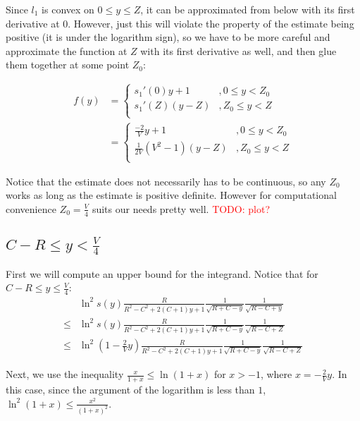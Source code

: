 \documentclass[12pt, a4paper]{article}
\newcommand{\todo}[1]{{\large \textcolor{red}{TODO: #1}}}
\begin{document}
Since $l_1$ is convex on $0 \le y \le Z$, it can be approximated from below with its first derivative at $0$. However, just this will violate the property of the estimate being positive (it is under the logarithm sign), so we have to be more careful and approximate the function at $Z$ with its first derivative as well, and then glue them together at some point $Z_0$:

\begin{align*}
f(y)
& = 
\begin{cases}
s_1'(0) y + 1   &, 0 \le y < Z_0  \\
s_1'(Z) (y - Z) &, Z_0 \le y < Z \\
\end{cases}
\\
& =
\begin{cases}
\frac{-2}{V} y + 1   &, 0 \le y < Z_0  \\
\frac{1}{2 V}(V^2 - 1) (y - Z) &, Z_0 \le y < Z \\
\end{cases}
\end{align*}

Notice that the estimate does not necessarily has to be continuous, so any $Z_0$ works as long as the estimate is positive definite. However for computational convenience $Z_0 = \frac{V}{4}$ suits our needs pretty well. \todo{plot?}


\subsection*{$C - R \le y < \frac{V}{4}$}

First we will compute an upper bound for the integrand. Notice that for $C - R \le y \le \frac{V}{4}$:
\begin{align*}
       & \ln^2 s(y) \frac{R}{R^2 - C^2 + 2 (C + 1) y + 1} \frac{1}{\sqrt{R + C - y}} \frac{1}{\sqrt{R - C + y}}
\\ \le & \ln^2 s(y) \frac{R}{R^2 - C^2 + 2 (C + 1) y + 1} \frac{1}{\sqrt{R + C - y}} \frac{1}{\sqrt{R - C + Z}}
\\ \le & \ln^2 (1 - \frac{2}{V} y) \frac{R}{R^2 - C^2 + 2 (C + 1) y + 1} \frac{1}{\sqrt{R + C - y}} \frac{1}{\sqrt{R - C + Z}}
\end{align*}

Next, we use the inequality $\frac{x}{1 + x} \le \ln (1 + x)$ for $x > -1$, where $x = -\frac{2}{V} y$. In this case, since the argument of the logarithm is less than $1$, $\ln^2 (1 + x) \le \frac{x^2}{(1 + x)^2}$.
\end{document}
